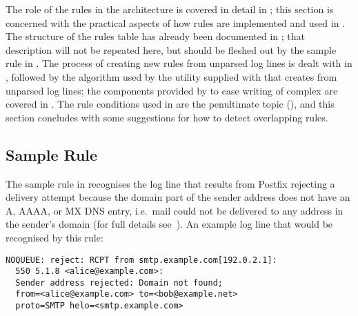 The role of the rules in the architecture is covered in detail in
; this section is concerned with the
practical aspects of how rules are implemented and used in \parsername{}.
The structure of the rules table has already been documented in
; that description will not be repeated here, but
should be fleshed out by the sample rule in .  The process of creating new rules from unparsed log lines
is dealt with in ,
followed by the algorithm used by the utility supplied with \parsername{}
that creates \regexes{} from unparsed log lines; the 
components provided by \parsername{} to ease writing of complex \regexes{}
are covered in .  The rule conditions used in
\parsername{} are the penultimate topic (), and this section concludes with some suggestions for how
to detect overlapping rules.

\subsection{Sample Rule}

\label{example rule in implementation}

The sample rule in 
recognises the log line that results from Postfix rejecting a delivery
attempt because the domain part of the sender address does not have an A,
AAAA, or MX DNS entry, i.e.\ mail could not be delivered to any address in
the sender's domain (for full details
see~\cite{reject-unknown-sender-domain}).  An example log line that would
be recognised by this rule:


\begin{verbatim}
NOQUEUE: reject: RCPT from smtp.example.com[192.0.2.1]:
  550 5.1.8 <alice@example.com>:
  Sender address rejected: Domain not found;
  from=<alice@example.com> to=<bob@example.net>
  proto=SMTP helo=<smtp.example.com>
\end{verbatim}

